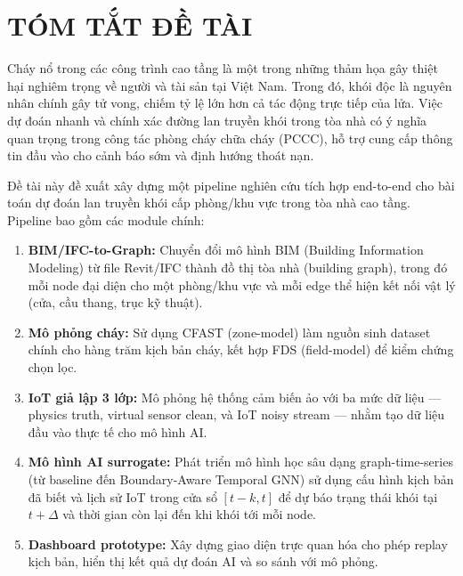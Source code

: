 
\chapter*{TÓM TẮT ĐỀ TÀI}

Cháy nổ trong các công trình cao tầng là một trong những thảm họa gây thiệt hại nghiêm trọng về người và tài sản tại Việt Nam. Trong đó, khói độc là nguyên nhân chính gây tử vong, chiếm tỷ lệ lớn hơn cả tác động trực tiếp của lửa. Việc dự đoán nhanh và chính xác đường lan truyền khói trong tòa nhà có ý nghĩa quan trọng trong công tác phòng cháy chữa cháy (PCCC), hỗ trợ cung cấp thông tin đầu vào cho cảnh báo sớm và định hướng thoát nạn.

Đề tài này đề xuất xây dựng một pipeline nghiên cứu tích hợp end-to-end cho bài toán dự đoán lan truyền khói cấp phòng/khu vực trong tòa nhà cao tầng. Pipeline bao gồm các module chính:
\begin{enumerate}
  \item \textbf{BIM/IFC-to-Graph:} Chuyển đổi mô hình BIM (Building Information Modeling) từ file Revit/IFC thành đồ thị tòa nhà (building graph), trong đó mỗi node đại diện cho một phòng/khu vực và mỗi edge thể hiện kết nối vật lý (cửa, cầu thang, trục kỹ thuật).
  \item \textbf{Mô phỏng cháy:} Sử dụng CFAST (zone-model) làm nguồn sinh dataset chính cho hàng trăm kịch bản cháy, kết hợp FDS (field-model) để kiểm chứng chọn lọc.
  \item \textbf{IoT giả lập 3 lớp:} Mô phỏng hệ thống cảm biến ảo với ba mức dữ liệu — physics truth, virtual sensor clean, và IoT noisy stream — nhằm tạo dữ liệu đầu vào thực tế cho mô hình AI.
  \item \textbf{Mô hình AI surrogate:} Phát triển mô hình học sâu dạng graph-time-series (từ baseline đến Boundary-Aware Temporal GNN) sử dụng cấu hình kịch bản đã biết và lịch sử IoT trong cửa sổ $[t-k,t]$ để dự báo trạng thái khói tại $t+\Delta$ và thời gian còn lại đến khi khói tới mỗi node.
  \item \textbf{Dashboard prototype:} Xây dựng giao diện trực quan hóa cho phép replay kịch bản, hiển thị kết quả dự đoán AI và so sánh với mô phỏng.
\end{enumerate}

